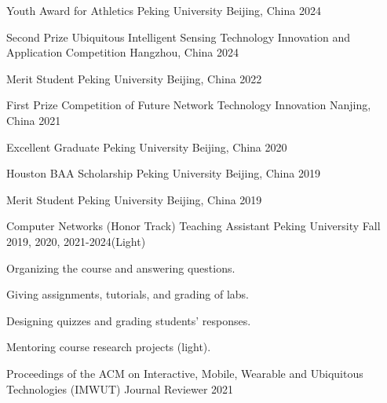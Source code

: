 \documentclass[11pt, a4paper]{awesome-cv}
\begin{document}

\begin{cvhonors}
		
	\cvhonor
	{Youth Award for Athletics} %
	{Peking University} %
	{Beijing, China} %
	{2024} %
	
	\cvhonor
	{Second Prize} %
	{Ubiquitous Intelligent Sensing Technology Innovation and Application Competition} %
	{Hangzhou, China} %
	{2024} %
		
	\cvhonor
	{Merit Student} %
	{Peking University} %
	{Beijing, China} %
	{2022} %
	
	\cvhonor
	{First Prize} %
	{Competition of Future Network Technology Innovation} %
	{Nanjing, China} %
	{2021} %
	
	\cvhonor
	{Excellent Graduate} %
	{Peking University} %
	{Beijing, China} %
	{2020} %
	
	\cvhonor
	{Houston BAA Scholarship} %
	{Peking University} %
	{Beijing, China} %
	{2019} %
	
	\cvhonor
	{Merit Student} %
	{Peking University} %
	{Beijing, China} %
	{2019} %

\end{cvhonors}

\begin{cventries}
	
	\cventry
	{Computer Networks (Honor Track)}
	{Teaching Assistant}
	{Peking University}
	{Fall 2019, 2020, 2021-2024(Light)}
	{
		\begin{cvitems} %
			\item {Organizing the course and answering questions.}
			\item {Giving assignments, tutorials, and grading of labs.}
			\item {Designing quizzes and grading students' responses.}
			\item {Mentoring course research projects (light).}
		\end{cvitems}
	}
	
	\cventry
	{Proceedings of the ACM on Interactive, Mobile, Wearable and Ubiquitous Technologies (IMWUT)} %
	{Journal Reviewer} %
	{} %
	{2021} %
	{}	
	
\end{cventries}

%
%
%
%
%
%
%
%


\end{document}
